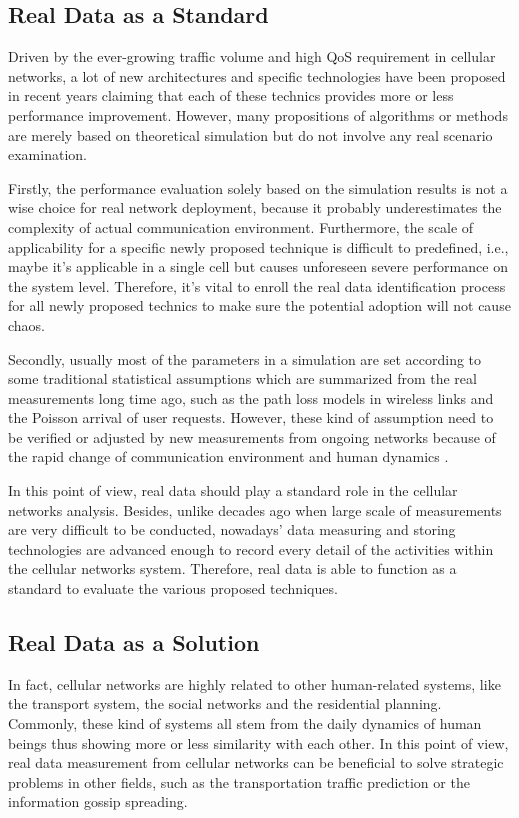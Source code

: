 \subsection{Real Data as a Standard}
Driven by the ever-growing traffic volume and high QoS requirement in cellular networks, a lot of new architectures and specific technologies have been proposed in recent years claiming that each of these technics provides more or less performance improvement. However, many propositions of algorithms or methods are merely based on theoretical simulation but do not involve any real scenario examination.

Firstly, the performance evaluation solely based on the simulation results is not a wise choice for real network deployment, because it probably underestimates the complexity of actual communication environment. Furthermore, the scale of applicability for a specific newly proposed technique is difficult to predefined, i.e., maybe it's applicable in a single cell but causes unforeseen severe performance on the system level. Therefore, it's vital to enroll the real data identification process for all newly proposed technics to make sure the potential adoption will not cause chaos.

Secondly, usually most of the parameters in a simulation are set according to some traditional statistical assumptions which are summarized from the real measurements long time ago, such as the path loss models in wireless links and the Poisson arrival of user requests. However, these kind of assumption need to be verified or adjusted by new measurements from ongoing networks because of the rapid change of communication environment and human dynamics \cite{steenbruggen2013mobile}.

In this point of view, real data should play a standard role in the cellular networks analysis. Besides, unlike decades ago when large scale of measurements are very difficult to be conducted, nowadays' data measuring and storing technologies are advanced enough to record every detail of the activities within the cellular networks system. Therefore, real data is able to function as a standard to evaluate the various proposed techniques.

\subsection{Real Data as a Solution}
In fact, cellular networks are highly related to other human-related systems, like the transport system, the social networks and the residential planning. Commonly, these kind of systems all stem from the daily dynamics of human beings thus showing more or less similarity with each other. In this point of view, real data measurement from cellular networks can be beneficial to solve strategic problems in other fields, such as the transportation traffic prediction or the information gossip spreading.

